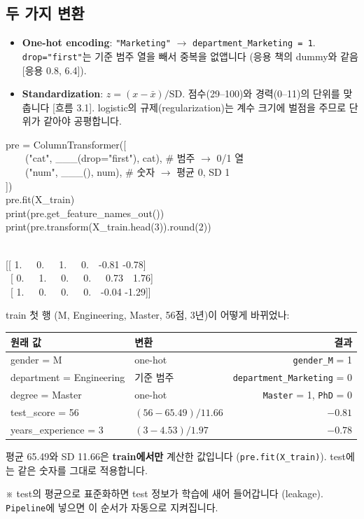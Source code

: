 \documentclass[11pt,a4paper]{article}
\newcommand{\term}[1]{\textbf{#1}}
\newcommand{\code}[1]{\texttt{#1}}
\newcommand{\aside}[1]{{\footnotesize\color{black!65}#1}}
\begin{document}
\subsection{두 가지 변환}
\begin{itemize}
\item \term{One-hot encoding}: \code{"Marketing"} $\to$ \code{department\_Marketing = 1}. \code{drop="first"}는 기준 범주 열을 빼서 중복을 없앱니다 (응용 책의 dummy와 같음 [응용 0.8, 6.4]).
\item \term{Standardization}: $z=(x-\bar x)/\text{SD}$. 점수(29–100)와 경력(0–11)의 단위를 맞춥니다 [흐름 3.1]. logistic의 규제(regularization)는 계수 크기에 벌점을 주므로 단위가 같아야 공평합니다.
\end{itemize}

\begin{codebox}
pre = ColumnTransformer([\\
\ \ \ \ ("cat", \_\_\_(drop="first"), cat), \hfill \# 범주 $\to$ 0/1 열\\
\ \ \ \ ("num", \_\_\_(), num), \hfill \# 숫자 $\to$ 평균 0, SD 1\\
])\\
pre.fit(X\_train)\\
print(pre.get\_feature\_names\_out())\\
print(pre.transform(X\_train.head(3)).round(2))
\end{codebox}
\begin{outbox}
\\
{}[[ 1.\ \ \ 0.\ \ \ 1.\ \ \ 0.\ \ -0.81 -0.78]\\
\ [ 0.\ \ \ 1.\ \ \ 0.\ \ \ 0.\ \ \ 0.73\ \ 1.76]\\
\ [ 1.\ \ \ 0.\ \ \ 0.\ \ \ 0.\ \ -0.04 -1.29]]
\end{outbox}

\begin{howbox}
train 첫 행 (M, Engineering, Master, 56점, 3년)이 어떻게 바뀌었나:
\begin{center}\small
\begin{tabular}{@{}l l r@{}}
\toprule
원래 값 & 변환 & 결과 \\
\midrule
gender = M & one-hot & \code{gender\_M} = 1 \\
department = Engineering & 기준 범주 & \code{department\_Marketing} = 0 \\
degree = Master & one-hot & \code{Master} = 1, \code{PhD} = 0 \\
test\_score = 56 & $(56-65.49)/11.66$ & $-0.81$ \\
years\_experience = 3 & $(3-4.53)/1.97$ & $-0.78$ \\
\bottomrule
\end{tabular}
\end{center}
평균 65.49와 SD 11.66은 \textbf{train에서만} 계산한 값입니다 (\code{pre.fit(X\_train)}). test에는 같은 숫자를 그대로 적용합니다.
\end{howbox}
\aside{※ test의 평균으로 표준화하면 test 정보가 학습에 새어 들어갑니다 (leakage). \code{Pipeline}에 넣으면 이 순서가 자동으로 지켜집니다.}
\end{document}
